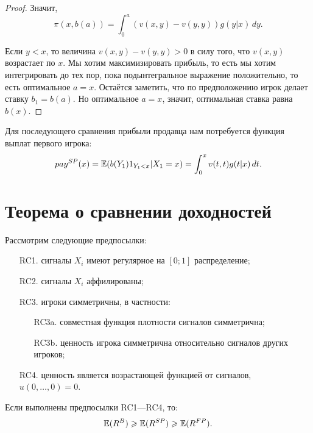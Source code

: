 \begin{itemize}
\begin{proof}
Значит,
\begin{equation}
\pi(x,b(a))=\int_{0}^{a}(v(x,y)-v(y,y)) g(y|x) \, dy.
\end{equation}

Если $ y<x $, то величина $ v(x,y)-v(y,y)>0 $ в силу того, что $ v(x,y) $ возрастает по $ x $. Мы хотим максимизировать прибыль, то есть мы хотим интегрировать до тех пор, пока подынтегральное выражение положительно, то есть оптимальное $ a=x $. Остаётся заметить, что по предположению игрок делает ставку $ b_{1}=b(a) $. Но оптимальное $ a=x $, значит, оптимальная ставка равна $ b(x) $.


\end{proof}


Для последующего сравнения прибыли продавца нам потребуется функция выплат первого игрока:
\begin{equation}
pay^{SP}(x)=\operatorname{\mathbb{E}}(b(Y_{1})1_{Y_{1}<x}|X_{1}=x)=\int_{0}^{x}v(t,t)g(t|x) \, dt.
\end{equation}





\end{itemize}



\section{Теорема о сравнении доходностей}


\begin{myth}

Рассмотрим следующие предпосылки:

\begin{enumerate}
\item[RC1.] сигналы $ X_{i} $ имеют регулярное на $ [0;1] $ распределение;
\item[RC2.] сигналы $ X_{i} $ аффилированы;
\item[RC3.] игроки симметричны, в частности:
\begin{enumerate}
\item[RC3a.] совместная функция плотности сигналов симметрична;
\item[RC3b.] ценность игрока симметрична относительно сигналов других игроков;
\end{enumerate}
\item[RC4.] ценность является возрастающей функцией от сигналов, $ u(0,\ldots,0)=0 $.

\end{enumerate}

Если выполнены предпосылки RC1—RC4, то:
\begin{equation}
\operatorname{\mathbb{E}}(R^{B})\geqslant \operatorname{\mathbb{E}}(R^{SP})\geqslant \operatorname{\mathbb{E}}(R^{FP}).
\end{equation}

\end{myth}

